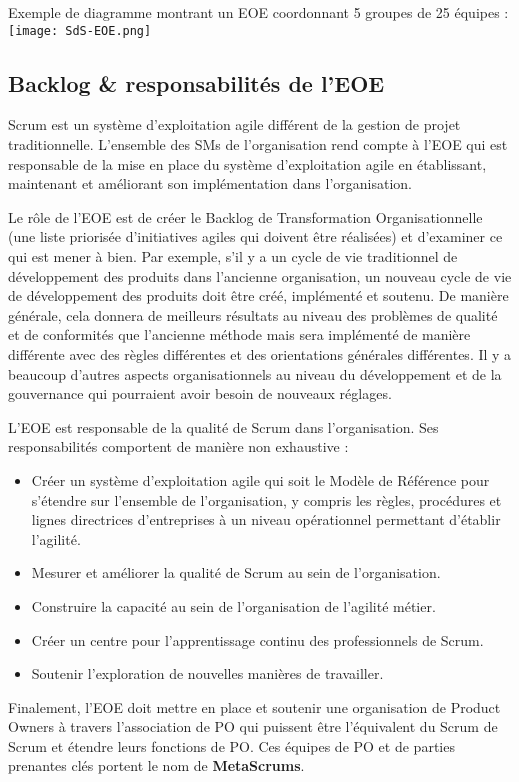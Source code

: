 \documentclass[french,12pt,a4paper,parskip=full]{scrartcl}
\begin{document}
Exemple de diagramme montrant un EOE coordonnant 5 groupes de 25 équipes :\\

\texttt{[image: SdS-EOE.png]}

\newpage
\subsection{Backlog \& responsabilités de l'EOE}
Scrum est un système d'exploitation agile différent de la gestion de projet traditionnelle.
L'ensemble des SMs de l'organisation rend compte à l'EOE qui est responsable de la mise
en place du système d'exploitation agile en établissant, maintenant et améliorant son
implémentation dans l'organisation.

Le rôle de l'EOE est de créer le Backlog de Transformation Organisationnelle (une liste
priorisée d'initiatives agiles qui doivent être réalisées) et d'examiner ce qui est mener à
bien. Par exemple, s'il y a un cycle de vie traditionnel de développement des produits dans
l'ancienne organisation, un nouveau cycle de vie de développement des produits doit être
créé, implémenté et soutenu. De manière générale, cela donnera de meilleurs résultats au
niveau des problèmes de qualité et de conformités que l'ancienne méthode mais sera
implémenté de manière différente avec des règles différentes et des orientations
générales différentes. Il y a beaucoup d'autres aspects organisationnels au niveau du
développement et de la gouvernance qui pourraient avoir besoin de nouveaux réglages.

L'EOE est responsable de la qualité de Scrum dans l'organisation. Ses responsabilités
comportent de manière non exhaustive :
\begin{itemize}
\item Créer un système d'exploitation agile qui soit le Modèle de Référence pour
s'étendre sur l'ensemble de l'organisation, y compris les règles, procédures et
lignes directrices d'entreprises à un niveau opérationnel permettant d'établir
l'agilité.
\item Mesurer et améliorer la qualité de Scrum au sein de l'organisation.
\item Construire la capacité au sein de l'organisation de l'agilité métier.
\item Créer un centre pour l'apprentissage continu des professionnels de Scrum.
\item Soutenir l'exploration de nouvelles manières de travailler.
\end{itemize}
Finalement, l'EOE doit mettre en place et soutenir une organisation de Product Owners à
travers l'association de PO qui puissent être l'équivalent du Scrum de Scrum et étendre
leurs fonctions de PO. Ces équipes de PO et de parties prenantes clés portent le nom de
\textbf{MetaScrums}.
\end{document}
